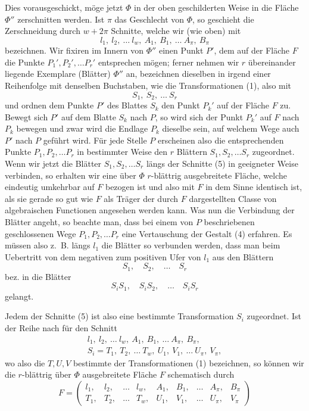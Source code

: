 \documentclass{article}
\begin{document}
Dies vorausgeschickt, möge jetzt $\Phi$ in der oben geschilderten Weise in die Fläche $\Phi''$ zerschnitten werden. Ist $\pi$ das Geschlecht von $\Phi$, so geschieht die Zerschneidung durch $w + 2\pi$ Schnitte, welche wir (wie oben) mit
\[
l_1, \ l_2, \ \dots \ l_w, \ A_1, \ B_1, \ \dots \ A_\pi, \ B_\pi
\tag{5}
\]
bezeichnen. Wir fixiren im Innern von $\Phi''$ einen Punkt $P'$, dem auf der Fläche $F$ die Punkte $P_1', P_2', \dots P_r'$ entsprechen mögen; ferner nehmen wir $r$ übereinander liegende Exemplare (Blätter) $\Phi''$ an, bezeichnen dieselben in irgend einer Reihenfolge mit denselben Buchstaben, wie die Transformationen (1), also mit
\[
S_1, \ S_2, \ \dots \ S_r
\]
und ordnen dem Punkte $P'$ des Blattes $S_k$ den Punkt $P_k'$ auf der Fläche $F$ zu. Bewegt sich $P'$ auf dem Blatte $S_k$ nach $P$, so wird sich der Punkt $P_k'$ auf $F$ nach $P_k$ bewegen und zwar wird die Endlage $P_k$ dieselbe sein, auf welchem Wege auch $P'$ nach $P$ geführt wird. Für jede Stelle $P$ erscheinen also die entsprechenden Punkte $P_1, P_2, \dots P_r$ in bestimmter Weise den $r$ Blättern $S_1, S_2, \dots S_r$ zugeordnet. Wenn wir jetzt die Blätter $S_1, S_2, \dots S_r$ längs der Schnitte (5) in geeigneter Weise verbinden, so erhalten wir eine über $\Phi$ $r$-blättrig ausgebreitete Fläche, welche eindeutig umkehrbar auf $F$ bezogen ist und also mit $F$ in dem Sinne identisch ist, als sie gerade so gut wie $F$ als Träger der durch $F$ dargestellten Classe von algebraischen Functionen angesehen werden kann. Was nun die Verbindung der Blätter angeht, so beachte man, dass bei einem von $P$ beschriebenen geschlossenen Wege $P_1, P_2, \dots P_r$ eine Vertauschung der Gestalt (4) erfahren. Es müssen also z.~B. längs $l_1$ die Blätter so verbunden werden, dass man beim Uebertritt von dem negativen zum positiven Ufer von $l_1$ aus den Blättern
\[
S_1, \quad S_2, \quad \dots \quad S_r
\]
bez. in die Blätter
\[
S_i S_1, \quad S_i S_2, \quad \dots \quad S_i S_r
\]
gelangt.

Jedem der Schnitte (5) ist also eine bestimmte Transformation $S_i$ zugeordnet. Ist der Reihe nach für den Schnitt
\[
\begin{gathered}
l_1, \ l_2, \ \dots \ l_w, \ A_1, \ B_1, \ \dots \ A_\pi, \ B_\pi, \\
S_i = T_1, \ T_2, \ \dots \ T_w, \ U_1, \ V_1, \ \dots \ U_\pi, \ V_\pi,
\end{gathered}
\]
wo also die $T, U, V$ bestimmte der Transformationen (1) bezeichnen, so können wir die $r$-blättrig über $\Phi$ ausgebreitete Fläche $F$ schematisch durch
\[
F = \begin{pmatrix}
l_1, & l_2, & \dots & l_w, & A_1, & B_1, & \dots & A_\pi, & B_\pi \\
T_1, & T_2, & \dots & T_w, & U_1, & V_1, & \dots & U_\pi, & V_\pi
\end{pmatrix}
\tag{6}
\]
\end{document}
